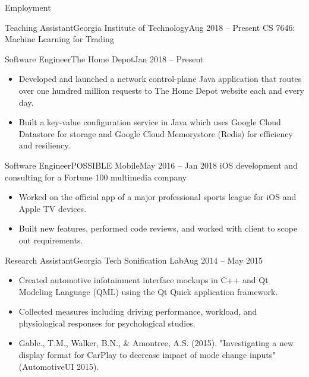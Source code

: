 \documentclass[]{mcdowellcv}
\begin{document}
	\begin{cvsection}{Employment}
		\begin{cvsubsection}{Teaching Assistant}{Georgia Institute of Technology}{Aug 2018 -- Present}
			CS 7646: Machine Learning for Trading
		\end{cvsubsection}

		\begin{cvsubsection}{Software Engineer}{The Home Depot}{Jan 2018 -- Present}
			\begin{itemize}
				\item Developed and launched a network control-plane Java application that routes over one hundred million requests to The Home Depot website each and every day.
				\item Built a key-value configuration service in Java which uses Google Cloud Datastore for storage and Google Cloud Memorystore (Redis) for efficiency and resiliency.
			\end{itemize}
		\end{cvsubsection}
		
		\begin{cvsubsection}{Software Engineer}{POSSIBLE Mobile}{May 2016 -- Jan 2018}	
			iOS development and consulting for a Fortune 100 multimedia company
			\begin{itemize}
				\item Worked on the official app of a major professional sports league for iOS and Apple TV devices.
				\item Built new features, performed code reviews, and worked with client to scope out requirements.
			\end{itemize}
		\end{cvsubsection}
		
		\begin{cvsubsection}{Research Assistant}{Georgia Tech Sonification Lab}{Aug 2014 -- May 2015}		
			\begin{itemize}
				\item Created automotive infotainment interface mockups in C++ and Qt Modeling Language (QML) using the Qt Quick application framework.
				\item Collected measures including driving performance, workload, and physiological responses for psychological studies.
				\item Gable., T.M., Walker, B.N., \& Amontree, A.S. (2015). "Investigating a new display format for CarPlay to decrease impact of mode change inputs" (AutomotiveUI 2015).
			\end{itemize}
		\end{cvsubsection}
		

\end{cvsection}
\end{document}
